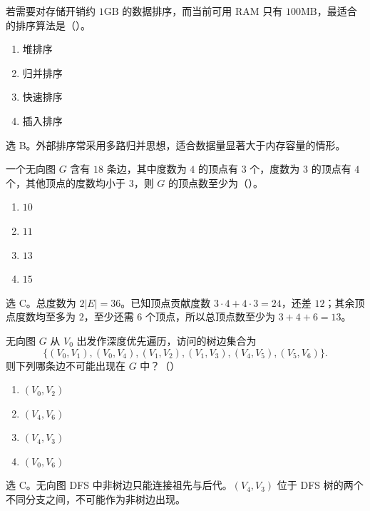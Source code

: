 \begin{question}
若需要对存储开销约 $1\mathrm{GB}$ 的数据排序，而当前可用 RAM 只有 $100\mathrm{MB}$，最适合的排序算法是（\quad）。
\begin{enumerate}
  \item 堆排序
  \item 归并排序
  \item 快速排序
  \item 插入排序
\end{enumerate}
\begin{solution}
选 B。外部排序常采用多路归并思想，适合数据量显著大于内存容量的情形。
\end{solution}
\end{question}

\begin{question}
一个无向图 $G$ 含有 $18$ 条边，其中度数为 $4$ 的顶点有 $3$ 个，度数为 $3$ 的顶点有 $4$ 个，其他顶点的度数均小于 $3$，则 $G$ 的顶点数至少为（\quad）。
\begin{enumerate}
  \item $10$
  \item $11$
  \item $13$
  \item $15$
\end{enumerate}
\begin{solution}
选 C。总度数为 $2|E|=36$。已知顶点贡献度数 $3\cdot4+4\cdot3=24$，还差 $12$；其余顶点度数均至多为 $2$，至少还需 $6$ 个顶点，所以总顶点数至少为 $3+4+6=13$。
\end{solution}
\end{question}

\begin{question}
无向图 $G$ 从 $V_0$ 出发作深度优先遍历，访问的树边集合为
\[
\{(V_0,V_1),(V_0,V_4),(V_1,V_2),(V_1,V_3),(V_4,V_5),(V_5,V_6)\}.
\]
则下列哪条边不可能出现在 $G$ 中？（\quad）
\begin{enumerate}
  \item $(V_0,V_2)$
  \item $(V_4,V_6)$
  \item $(V_4,V_3)$
  \item $(V_0,V_6)$
\end{enumerate}
\begin{solution}
选 C。无向图 DFS 中非树边只能连接祖先与后代。$(V_4,V_3)$ 位于 DFS 树的两个不同分支之间，不可能作为非树边出现。
\end{solution}
\end{question}

